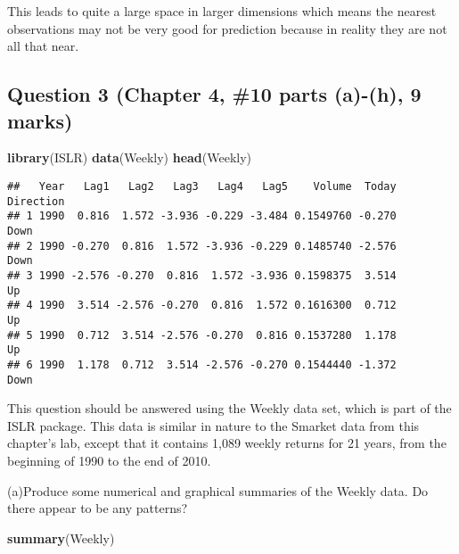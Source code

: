 \documentclass[]{article}
\newenvironment{Shaded}{\begin{snugshade}}{\end{snugshade}}
\newcommand{\KeywordTok}[1]{\textcolor[rgb]{0.13,0.29,0.53}{\textbf{#1}}}
\newcommand{\NormalTok}[1]{#1}
\begin{document}
This leads to quite a large space in larger dimensions which means the
nearest observations may not be very good for prediction because in
reality they are not all that near.

\hypertarget{question-3-chapter-4-10-parts-a-h-9-marks}{%
\subsection{Question 3 (Chapter 4, \#10 parts (a)-(h), 9
marks)}\label{question-3-chapter-4-10-parts-a-h-9-marks}}

\begin{Shaded}
\begin{Highlighting}[]
\KeywordTok{library}\NormalTok{(ISLR)}
\KeywordTok{data}\NormalTok{(Weekly)}
\KeywordTok{head}\NormalTok{(Weekly)}
\end{Highlighting}
\end{Shaded}

\begin{verbatim}
##   Year   Lag1   Lag2   Lag3   Lag4   Lag5    Volume  Today Direction
## 1 1990  0.816  1.572 -3.936 -0.229 -3.484 0.1549760 -0.270      Down
## 2 1990 -0.270  0.816  1.572 -3.936 -0.229 0.1485740 -2.576      Down
## 3 1990 -2.576 -0.270  0.816  1.572 -3.936 0.1598375  3.514        Up
## 4 1990  3.514 -2.576 -0.270  0.816  1.572 0.1616300  0.712        Up
## 5 1990  0.712  3.514 -2.576 -0.270  0.816 0.1537280  1.178        Up
## 6 1990  1.178  0.712  3.514 -2.576 -0.270 0.1544440 -1.372      Down
\end{verbatim}

This question should be answered using the Weekly data set, which is
part of the ISLR package. This data is similar in nature to the Smarket
data from this chapter's lab, except that it contains 1,089 weekly
returns for 21 years, from the beginning of 1990 to the end of 2010.

(a)Produce some numerical and graphical summaries of the Weekly data. Do
there appear to be any patterns?

\begin{Shaded}
\begin{Highlighting}[]
\KeywordTok{summary}\NormalTok{(Weekly)}
\end{Highlighting}
\end{Shaded}
\end{document}
